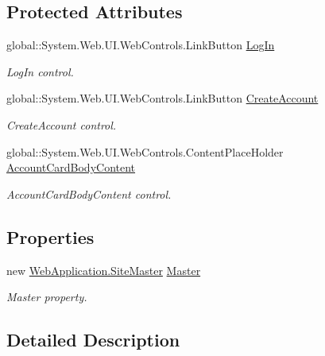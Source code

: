 \subsection*{Protected Attributes}
\begin{DoxyCompactItemize}
\item 
global\+::\+System.\+Web.\+U\+I.\+Web\+Controls.\+Link\+Button \mbox{\hyperlink{classWebApplication_1_1Account_acf1883724583703dee1d49d5e7f8c9c8}{Log\+In}}
\begin{DoxyCompactList}\small\item\em Log\+In control. \end{DoxyCompactList}\item 
global\+::\+System.\+Web.\+U\+I.\+Web\+Controls.\+Link\+Button \mbox{\hyperlink{classWebApplication_1_1Account_a2459dd326051499977cd9d924025d7a9}{Create\+Account}}
\begin{DoxyCompactList}\small\item\em Create\+Account control. \end{DoxyCompactList}\item 
global\+::\+System.\+Web.\+U\+I.\+Web\+Controls.\+Content\+Place\+Holder \mbox{\hyperlink{classWebApplication_1_1Account_ad4d7bdd1cdc63398539ccec0bac3b7fa}{Account\+Card\+Body\+Content}}
\begin{DoxyCompactList}\small\item\em Account\+Card\+Body\+Content control. \end{DoxyCompactList}\end{DoxyCompactItemize}
\subsection*{Properties}
\begin{DoxyCompactItemize}
\item 
new \mbox{\hyperlink{classWebApplication_1_1SiteMaster}{Web\+Application.\+Site\+Master}} \mbox{\hyperlink{classWebApplication_1_1Account_adc7988cc207da465340c81ceeda4c7cf}{Master}}
\begin{DoxyCompactList}\small\item\em Master property. \end{DoxyCompactList}\end{DoxyCompactItemize}


\subsection{Detailed Description}


